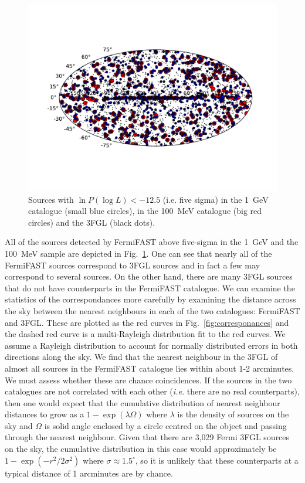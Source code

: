 \documentclass[useAMS,usenatbib]{mn2e}
\begin{document}
\begin{figure}
  \includegraphics[width=\textwidth,clip,trim=0.6in 1in 0.8in
    1in]{source_plot}
  \caption{Sources with $\ln P(\log L)<-12.5$ (i.e. five sigma) in the
    1~GeV catalogue (small blue circles), in the 100~MeV catalogue
    (big red circles) and the 3FGL (black dots).}
  \label{fig:sources}
\end{figure}

All of the sources detected by FermiFAST above five-sigma in the 1~GeV
and the 100~MeV sample are depicted in Fig.~\ref{fig:sources}.  One
can see that nearly all of the FermiFAST sources correspond to 3FGL
sources and in fact a few may correspond to several sources.  On the
other hand, there are many 3FGL sources that do not have counterparts
in the FermiFAST catalogue.  We can examine the statistics of the
correspondances more carefully by examining the distance across the
sky between the nearest neighbours in each of the two catalogues:
FermiFAST and 3FGL.  These are plotted as the red curves in
Fig.~\ref{fig:corresponances} and the dashed red curve is a multi-Rayleigh
distribution fit to the red curves.  We assume a Rayleigh distribution
to account for normally distributed errors in both directions along
the sky.  We find that the nearest neighbour in the 3FGL of almost all sources
in the FermiFAST catalogue lies within about 1-2
arcminutes.  We must assess whether these are chance coincidences.  If
the sources in the two catalogues are not correlated with each other
({\em i.e.} there are no real counterparts), then one would expect
that the cumulative distribution of nearest neighbour distances to
grow as a $1-\exp(\lambda \Omega)$ where $\lambda$ is the density of
sources on the sky and $\Omega$ is solid angle enclosed by a circle
centred on the object and passing through the nearest neighbour.
Given that there are 3,029 Fermi 3FGL sources on the sky, the
cumulative distribution in this case would approximately be
$1-\exp(-r^2/2\sigma^2)$ where $\sigma\approx 1.5^\circ$, so it is
unlikely that these counterparts at a typical distance of 1 arcminutes
are by chance.
\end{document}
